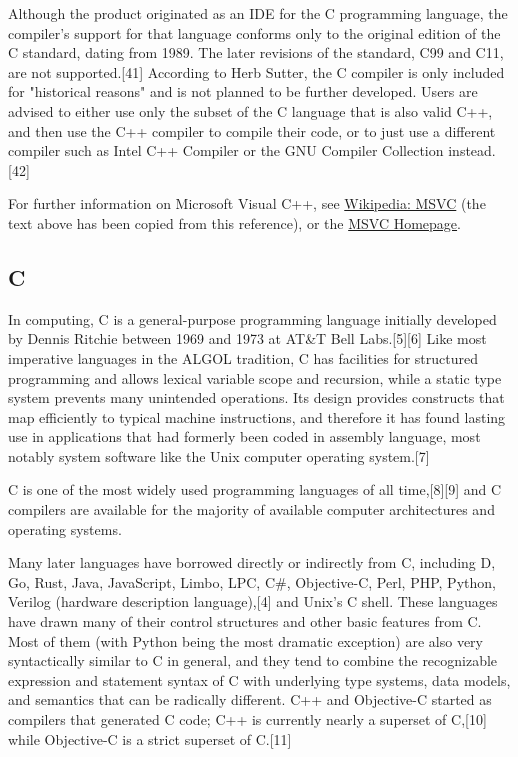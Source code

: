 \vpara
Although the product originated as an IDE for the C programming language, the compiler's support for that language conforms only to the original edition of the C standard, dating from 1989. The later revisions of the standard, C99 and C11, are not supported.[41] According to Herb Sutter, the C compiler is only included for "historical reasons" and is not planned to be further developed. Users are advised to either use only the subset of the C language that is also valid C++, and then use the C++ compiler to compile their code, or to just use a different compiler such as Intel C++ Compiler or the GNU Compiler Collection instead.[42]

\vpara
For further information on Microsoft Visual C++, see \href{http://en.wikipedia.org/wiki/Visual_C\%2B\%2B}{Wikipedia: MSVC} (the text above has been copied from this reference), or the  \href{http://msdn.microsoft.com/en-us/vstudio/hh386302}{MSVC Homepage}.

\newpage
\subsection{C}
In computing, C is a general-purpose programming language initially developed by Dennis Ritchie between 1969 and 1973 at AT\&T Bell Labs.[5][6] Like most imperative languages in the ALGOL tradition, C has facilities for structured programming and allows lexical variable scope and recursion, while a static type system prevents many unintended operations. Its design provides constructs that map efficiently to typical machine instructions, and therefore it has found lasting use in applications that had formerly been coded in assembly language, most notably system software like the Unix computer operating system.[7]

\vpara
C is one of the most widely used programming languages of all time,[8][9] and C compilers are available for the majority of available computer architectures and operating systems.

\vpara
Many later languages have borrowed directly or indirectly from C, including D, Go, Rust, Java, JavaScript, Limbo, LPC, C\#, Objective-C, Perl, PHP, Python, Verilog (hardware description language),[4] and Unix's C shell. These languages have drawn many of their control structures and other basic features from C. Most of them (with Python being the most dramatic exception) are also very syntactically similar to C in general, and they tend to combine the recognizable expression and statement syntax of C with underlying type systems, data models, and semantics that can be radically different. C++ and Objective-C started as compilers that generated C code; C++ is currently nearly a superset of C,[10] while Objective-C is a strict superset of C.[11]

